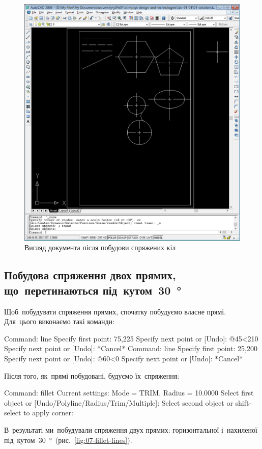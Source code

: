 \documentclass[
	a4paper,
	oneside,
	BCOR = 10mm,
	DIV = 12,
	12pt,
	headings = normal,
]{scrartcl}
\begin{document}
			\begin{figure}[!htbp]
				\centering
				\includegraphics[height=18\baselineskip]{./assets/y04s01-csdt-lab-01-01-p08.png}
				\caption{Вигляд документа після побудови спряжених кіл}
				\label{fig:06-fillet-circles}
			\end{figure}

		\subsection{Побудова спряження двох прямих, що~перетинаються під~кутом~\SI{30}{\degree}}
			Щоб~побудувати спряження прямих, спочатку побудуємо власне прямі. Для~цього виконаємо такі команди:
			\begin{codegeneric}
				Command: line
				Specify first point: 75,225
				Specify next point or [Undo]: @45<210
				Specify next point or [Undo]: *Cancel*
				Command: line
				Specify first point: 25,200
				Specify next point or [Undo]: @60<0
				Specify next point or [Undo]: *Cancel*
			\end{codegeneric}
			Після того, як~прямі побудовані, будуємо їх~спряження:
			\begin{codegeneric}
				Command: fillet
				Current settings: Mode = TRIM, Radius = 10.0000
				Select first object or [Undo/Polyline/Radius/Trim/Multiple]:
				Select second object or shift-select to apply corner:
			\end{codegeneric}
			В~результаті ми~побудували спряження двух прямих: горизонтальної і~нахиленої під~кутом~\SI{30}{\degree}~(рис.~\ref{fig:07-fillet-lines}).
\end{document}
